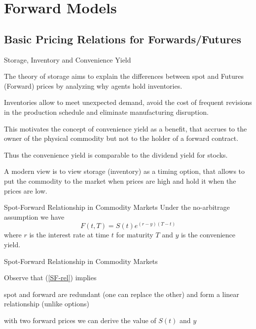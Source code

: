 \section{Forward Models}
\subsection{Basic Pricing Relations for Forwards/Futures}

{Storage, Inventory and Convenience Yield}






	The theory of storage aims to explain the differences between spot
and Futures (Forward) prices by analyzing why agents hold inventories.


	Inventories
allow to meet unexpected demand, avoid the cost of frequent revisions in
the production schedule and eliminate manufacturing disruption.


	This
motivates the concept of convenience yield as a benefit, that accrues to the
owner of the physical commodity but not to the holder of a forward contract.


	Thus the convenience yield is comparable to the dividend yield for stocks.


	A modern view is to view storage (inventory) as a timing option, that
allows to put the commodity to the market when prices are high
and hold it when the prices are low.





{Spot-Forward Relationship in Commodity Markets }
Under the no-arbitrage assumption we have
\begin{equation}\label{SF-rel}
F(t,T)=S(t)e^{(r-y)(T-t)}
\end{equation}
where $r$ is the interest rate at time $t$ for maturity $T$ and $y$ is the convenience yield.

{Spot-Forward Relationship in Commodity Markets }

Observe that (\ref{SF-rel}) implies






	spot and forward are redundant (one can replace the other) and form a
linear relationship (unlike options)


	with two forward prices we can derive the value of $S(t)$ and $y$


